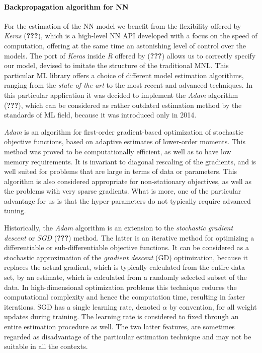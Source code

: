 \documentclass[11pt,]{article}
\let\oldparagraph\paragraph
\renewcommand{\paragraph}[1]{\oldparagraph{#1}\mbox{}}
\begin{document}
\hypertarget{backpropagation-algorithm-for-nn}{%
\paragraph{Backpropagation algorithm for
NN}\label{backpropagation-algorithm-for-nn}}

For the estimation of the NN model we benefit from the flexibility
offered by \emph{Keras} ({\textbf{???}}), which is a high-level NN API
developed with a focus on the speed of computation, offering at the same
time an astonishing level of control over the models. The port of
\emph{Keras} inside \emph{R} offered by ({\textbf{???}}) allows us to
correctly specify our model, devised to imitate the structure of the
traditional MNL. This particular ML library offers a choice of different
model estimation algorithms, ranging from the \emph{state-of-the-art} to
the most recent and advanced techniques. In this particular application
it was decided to implement the \emph{Adam} algorithm ({\textbf{???}}),
which can be considered as rather outdated estimation method by the
standards of ML field, because it was introduced only in 2014.

\emph{Adam} is an algorithm for first-order gradient-based optimization
of stochastic objective functions, based on adaptive estimates of
lower-order moments. This method was proved to be computationally
efficient, as well as to have low memory requirements. It is invariant
to diagonal rescaling of the gradients, and is well suited for problems
that are large in terms of data or parameters. This algorithm is also
considered appropriate for non-stationary objectives, as well as the
problems with very sparse gradients. What is more, one of the particular
advantage for us is that the hyper-parameters do not typically require
advanced tuning.

Historically, the \emph{Adam} algorithm is an extension to the
\emph{stochastic gradient descent} or \emph{SGD} ({\textbf{???}})
method. The latter is an iterative method for optimizing a
differentiable or sub-differentiable objective functions. It can be
considered as a stochastic approximation of the \emph{gradient descent}
(GD) optimization, because it replaces the actual gradient, which is
typically calculated from the entire data set, by an estimate, which is
calculated from a randomly selected subset of the data. In
high-dimensional optimization problems this technique reduces the
computational complexity and hence the computation time, resulting in
faster iterations. SGD has a single learning rate, denoted \(\alpha\) by
convention, for all weight updates during training. The learning rate is
considered to fixed through an entire estimation procedure as well. The
two latter features, are sometimes regarded as disadvantage of the
particular estimation technique and may not be suitable in all the
contexts.
\end{document}
